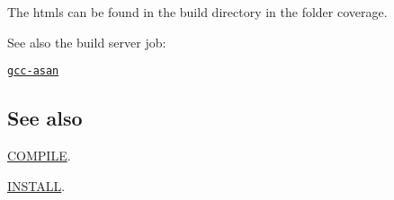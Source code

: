 The htmls can be found in the build directory in the folder {\ttfamily coverage}.

See also the build server job\+:


\begin{DoxyItemize}
\item \href{http://build.libelektra.org:8080/job/elektra-incremental/}{\tt gcc-\/asan}
\end{DoxyItemize}

\subsection*{See also}


\begin{DoxyItemize}
\item \hyperlink{doc_COMPILE_md}{C\+O\+M\+P\+I\+L\+E}.
\item \hyperlink{doc_INSTALL_md}{I\+N\+S\+T\+A\+L\+L}. 
\end{DoxyItemize}
